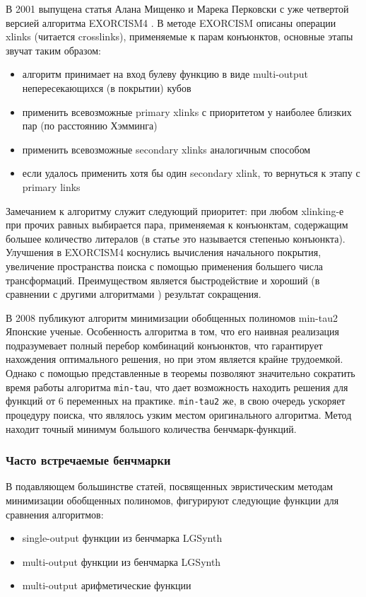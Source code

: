 \documentclass[a4paper,12pt,titlepage,finall]{article}
\begin{document}
В 2001 выпущена статья Алана Мищенко и Марека Перковски с уже четвертой версией алгоритма \textsc{EXORCISM4} \cite{exorcism4}.
В методе \textsc{EXORCISM} описаны операции xlinks (читается crosslinks), применяемые к парам конъюнктов, основные этапы звучат таким образом:
\begin{itemize}
    \item алгоритм принимает на вход булеву функцию в виде multi-output непересекающихся (в покрытии) кубов
    \item применить всевозможные primary xlinks с приоритетом у наиболее близких пар (по расстоянию Хэмминга)
    \item применить всевозможные secondary xlinks аналогичным способом
    \item если удалось применить хотя бы один secondary xlink, то вернуться к этапу с primary links
\end{itemize}
Замечанием к алгоритму служит следующий приоритет: при любом xlinking-е при прочих равных выбирается пара, применяемая к конъюнктам, содержащим большее количество литералов (в статье это называется степенью конъюнкта). Улучшения в \textsc{EXORCISM4} коснулись вычисления начального покрытия, увеличение пространства поиска с помощью применения большего числа трансформаций. Преимуществом является быстродействие и хороший (в сравнении с другими алгоритмами \cite{exmin2} \cite{mint}) результат сокращения.

В 2008 публикуют алгоритм минимизации обобщенных полиномов min-tau2 \cite{min-tau2} Японские ученые.
Особенность алгоритма в том, что его наивная реализация подразумевает полный перебор комбинаций конъюнктов, что гарантирует нахождения оптимального решения, но при этом является крайне трудоемкой. Однако с помощью представленные в \cite{min-tau} теоремы позволяют значительно сократить время работы алгоритма \texttt{min-tau}, что дает возможность находить решения для функций от 6 переменных на практике. \texttt{min-tau2} же, в свою очередь ускоряет процедуру поиска, что являлось узким местом оригинального алгоритма. Метод находит точный минимум большого количества бенчмарк-функций.

\subsubsection{Часто встречаемые бенчмарки}

В подавляющем большинстве статей, посвященных эвристическим методам минимизации обобщенных полиномов, фигурируют следующие функции для сравнения алгоритмов:
\begin{itemize}
    \item single-output функции из бенчмарка LGSynth
    \item multi-output функции из бенчмарка LGSynth
    \item multi-output арифметические функции
\end{itemize}
\end{document}
